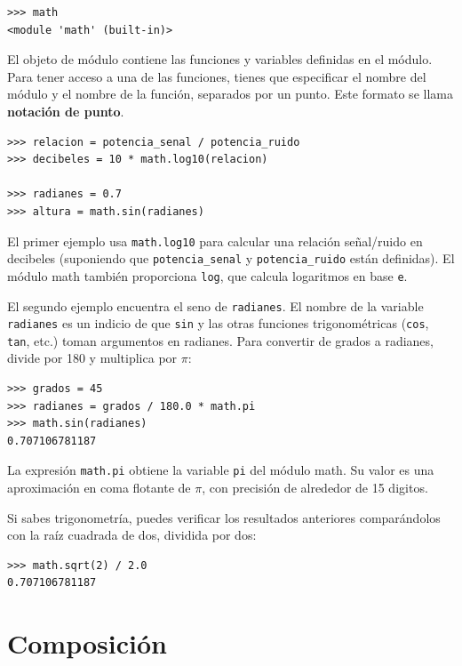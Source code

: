\documentclass[10pt]{book}
\begin{document}
\begin{verbatim}
>>> math
<module 'math' (built-in)>
\end{verbatim}
%
El objeto de módulo contiene las funciones y variables definidas en el
módulo. Para tener acceso a una de las funciones, tienes que especificar el nombre
del módulo y el nombre de la función, separados por un punto.
Este formato se llama {\bf notación de punto}.

\begin{verbatim}
>>> relacion = potencia_senal / potencia_ruido
>>> decibeles = 10 * math.log10(relacion)

>>> radianes = 0.7
>>> altura = math.sin(radianes)
\end{verbatim}
%
El primer ejemplo usa \verb"math.log10" para calcular
una relación señal/ruido en decibeles (suponiendo que \verb"potencia_senal" y
\verb"potencia_ruido" están definidas).  El módulo math también proporciona {\tt log},
que calcula logaritmos en base {\tt e}.

El segundo ejemplo encuentra el seno de {\tt radianes}.  El nombre de la variable {\tt radianes} es un indicio de que {\tt sin} y las otras funciones
trigonométricas ({\tt cos}, {\tt tan}, etc.)  toman argumentos en radianes. Para
convertir de grados a radianes, divide por 180 y multiplica por
$\pi$:

\begin{verbatim}
>>> grados = 45
>>> radianes = grados / 180.0 * math.pi
>>> math.sin(radianes)
0.707106781187
\end{verbatim}
%
La expresión {\tt math.pi} obtiene la variable {\tt pi} del módulo
math.  Su valor es una aproximación en coma flotante
de $\pi$, con precisión de alrededor de 15 digitos.

Si sabes
trigonometría, puedes verificar los resultados anteriores comparándolos con
la raíz cuadrada de dos, dividida por dos:

\begin{verbatim}
>>> math.sqrt(2) / 2.0
0.707106781187
\end{verbatim}
%

\section{Composición}
\end{document}
